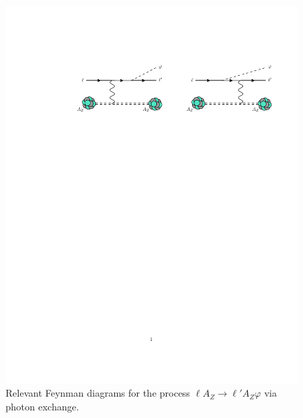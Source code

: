 \begin{figure}
    \centering
    \includegraphics[width=\linewidth]{figures/chapter4/production_diagram.pdf}
    \caption{Relevant Feynman diagrams for the process $\ell A_Z \rightarrow \ell' A_Z \varphi$ via photon exchange.} 
    \label{fig:production_diagram}
\end{figure}

